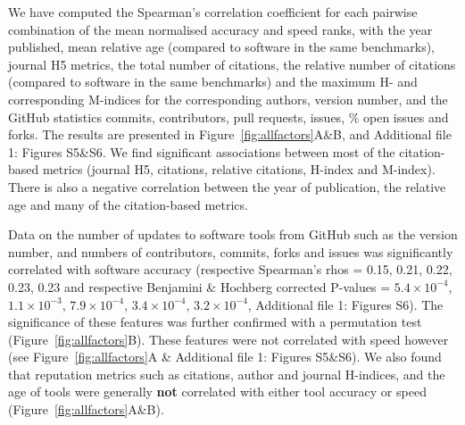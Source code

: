 \documentclass{bmcart}
\begin{document}
We have computed the Spearman’s correlation coefficient for each
pairwise combination of the mean normalised accuracy and speed ranks,
with the year published, mean relative age (compared to software in the
same benchmarks), journal H5 metrics, the total number of citations,
the relative number of citations (compared to software in the same
benchmarks) and the maximum H- and corresponding M-indices for the corresponding
authors, version number,
{\color{black}and the GitHub statistics commits, contributors, pull requests, issues, \% open issues and forks}.
The results are presented in Figure~\ref{fig:allfactors}A\&B, and Additional file 1: Figures S5\&S6. We find
significant associations between most of the citation-based metrics
(journal H5, citations, relative citations, H-index and
M-index). There is also a negative correlation between the year of
publication, the relative age and many of the citation-based metrics.

Data on the number of updates to software tools from GitHub such as
the version number, {\color{black}and numbers of contributors, commits, forks and issues } was significantly
correlated with software accuracy (respective Spearman’s rhos =
{\color{black}0.15, 0.21, 0.22, 0.23, 0.23 and respective Benjamini \& Hochberg
  corrected P-values = $5.4\times 10^{-4}$, $1.1\times 10^{-3}$, $7.9\times 10^{-4}$, $3.4\times 10^{-4}$, $3.2\times 10^{-4}$, Additional file 1: Figures S6}). %
The significance of these features was
further confirmed with a permutation test
(Figure~\ref{fig:allfactors}B).  These features were not correlated
with speed however (see Figure~\ref{fig:allfactors}A {\color{black}\& Additional file 1: Figures S5\&S6}).
We also found that
reputation metrics such as citations, author and journal H-indices,
and the age of tools were generally \textbf{not} correlated with
either tool accuracy or speed (Figure~\ref{fig:allfactors}A\&B).


\end{document}
